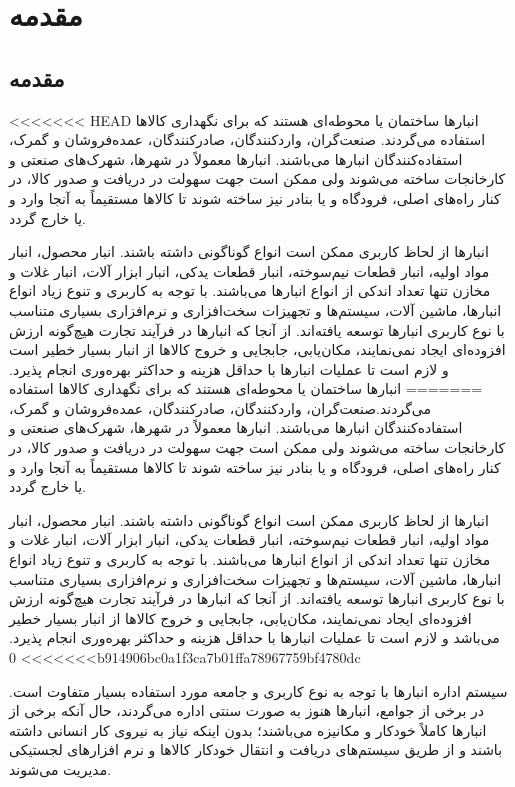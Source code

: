 \chapter{مقدمه}
\section{مقدمه}
<<<<<<< HEAD
انبارها ساختمان یا محوطه‌ای هستند که برای نگهداری کالاها استفاده می‌گردند. صنعت‌گران، واردکنندگان، صادرکنندگان، عمده‌فروشان و گمرک، استفاده‌کنندگان انبارها می‌باشند. انبارها معمولاً در شهرها، شهرک‌های صنعتی و کارخانجات ساخته می‌شوند ولی ممکن است جهت سهولت در دریافت و صدور کالا، در کنار راه‌های اصلی، فرودگاه و یا بنادر نیز ساخته شوند تا کالاها مستقیماً به آنجا وارد و یا خارج گردد.

انبار‌ها از لحاظ کاربری ممکن است انواع گوناگونی داشته باشند. انبار محصول، انبار مواد اولیه، انبار قطعات نیم‌سوخته، انبار قطعات یدکی، انبار ابزار آلات، انبار غلات و مخازن تنها تعداد اندکی از انواع انبارها می‌باشند. با توجه به کاربری و تنوع زیاد انواع انبارها، ماشین آلات، سیستم‌ها و تجهیزات سخت‌افزاری و نرم‌افزاری بسیاری متناسب با نوع کاربری انبارها توسعه یافته‌اند. از آنجا که انبارها در فرآیند تجارت هیچ‌گونه ارزش افزوده‌ای ایجاد نمی‌نمایند، مکان‌یابی، جابجایی و خروج کالاها از انبار بسیار خطیر است و لازم است تا عملیات انبارها با حداقل هزینه و حداکثر بهره‌وری انجام پذیرد.
=======
انبارها ساختمان یا محوطه‌ای هستند که برای نگهداری کالاها استفاده می‌گردند.صنعت‌گران، واردکنندگان، صادرکنندگان، عمده‌فروشان و گمرک، استفاده‌کنندگان انبارها می‌باشند. انبارها معمولاً در شهرها، شهرک‌های صنعتی و کارخانجات ساخته می‌شوند ولی ممکن است جهت سهولت در دریافت و صدور کالا، در کنار راه‌های اصلی، فرودگاه و یا بنادر نیز ساخته شوند تا کالاها مستقیماً به آنجا وارد و یا خارج گردد.

انبار‌ها از لحاظ کاربری ممکن است انواع گوناگونی داشته باشند. انبار محصول، انبار مواد اولیه، انبار قطعات نیم‌سوخته، انبار قطعات یدکی، انبار ابزار آلات، انبار غلات و مخازن تنها تعداد اندکی از انواع انبارها می‌باشند. با توجه به کاربری و تنوع زیاد انواع انبارها، ماشین آلات، سیستم‌ها و تجهیزات سخت‌افزاری و نرم‌افزاری بسیاری متناسب با نوع کاربری انبارها توسعه یافته‌اند. از آنجا که انبارها در فرآیند تجارت هیچ‌گونه ارزش افزوده‌ای ایجاد نمی‌نمایند، مکان‌یابی، جابجایی و خروج کالاها از انبار بسیار خطیر می‌باشد و لازم است تا عملیات انبارها با حداقل هزینه و حداکثر بهره‌وری انجام پذیرد.
>>>>>>> 0b914906bc0a1f3ca7b01ffa78967759bf4780dc

سیستم اداره انبارها با توجه به نوع کاربری و جامعه مورد استفاده بسیار متفاوت است. در برخی از جوامع، انبارها هنوز به صورت سنتی اداره می‌گردند، حال آنکه برخی از انبارها کاملاً خودکار و مکانیزه می‌باشند؛ بدون اینکه نیاز به نیروی کار انسانی داشته باشند و از طریق سیستم‌های دریافت و انتقال خودکار کالاها و نرم افزارهای لجستیکی مدیریت می‌شوند.

